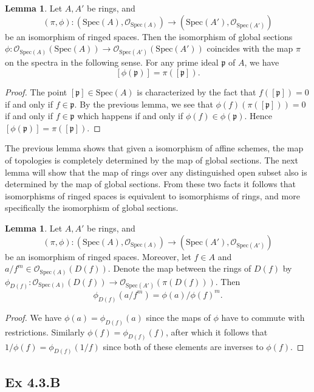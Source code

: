 \documentclass{article}
\theoremstyle{definition}
\newtheorem{lemma}[theorem]{Lemma}
\newcommand{\oo}{\mathcal{O}}
\newcommand{\osp}[1]{\oo_{\Spec\left(#1\right)}}
\newcommand{\Spec}{\text{Spec}}
\begin{document}
\begin{lemma}
	Let $A, A'$ be rings, and 
	\[
		(\pi, \phi) 
		: 
		(\Spec(A), \osp{A})
		\to
		(\Spec(A'), \osp{A'})
	\] 
	be an isomorphism of ringed spaces. Then the isomorphism of global sections 
	$\phi : \osp{A}(\Spec(A)) \to \osp{A'}(\Spec(A'))$ coincides
	with the map $\pi$ on the spectra in the following sense. For any prime 
	ideal $\mathfrak{p}$ of $A$, we have
	\[
		[\phi(\mathfrak{p})]
		=
		\pi([\mathfrak{p}]).
	\] 
\end{lemma}
\begin{proof}
	The point $[\mathfrak{p}] \in \Spec(A)$ is characterized by the fact that
	$f([\mathfrak{p}]) = 0$ if and only if $f \in \mathfrak{p}$. By the
	previous lemma, we see that $\phi(f)(\pi([\mathfrak{p}])) = 0$ if and only
	if $f \in \mathfrak{p}$ which happens if and only if $\phi(f) \in
	\phi(\mathfrak{p})$. Hence $[\phi(\mathfrak{p})] = \pi([\mathfrak{p}])$.
\end{proof}

The previous lemma shows that given a isomorphism of affine schemes, the map of
topologies is completely determined by the map of global sections. The next
lemma will show that the map of rings over any distinguished open subset also
is determined by the map of global sections. From these two facts it follows
that isomorphisms of ringed spaces is equivalent to isomorphisms of rings, and
more specifically the isomorphism of global sections.

\begin{lemma}
	Let $A, A'$ be rings, and 
	\[
		(\pi, \phi) 
		: 
		(\Spec(A), \osp{A})
		\to
		(\Spec(A'), \osp{A'})
	\] 
	be an isomorphism of ringed spaces. Moreover, let $f \in A$ and $a/f^m \in
	\osp{A}(D(f))$. Denote the map between the rings of $D(f)$ by $\phi_{D(f)}
	: \osp{A}(D(f)) \to \osp{A'}(\pi(D(f)))$. Then
	\[
		\phi_{D(f)}(a/f^m)
		=
		\phi(a)/\phi(f)^m.
	\] 
\end{lemma}
\begin{proof}
	We have $\phi(a) = \phi_{D(f)}(a)$ since the maps of $\phi$ have to commute
	with restrictions. Similarly $\phi(f) = \phi_{D(f)}(f)$, after which it
	follows that $1/\phi(f) = \phi_{D(f)}(1/f)$ since both of these elements
	are inverses to $\phi(f)$.
\end{proof}


\subsection*{Ex 4.3.B}
\end{document}
